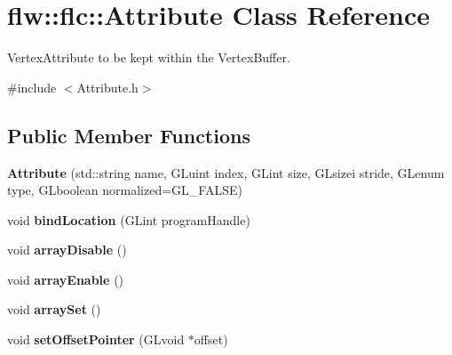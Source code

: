 \hypertarget{classflw_1_1flc_1_1Attribute}{}\section{flw\+:\+:flc\+:\+:Attribute Class Reference}
\label{classflw_1_1flc_1_1Attribute}


Vertex\+Attribute to be kept within the Vertex\+Buffer.  




{\ttfamily \#include $<$Attribute.\+h$>$}

\subsection*{Public Member Functions}
\begin{DoxyCompactItemize}
\item 
\mbox{\label{classflw_1_1flc_1_1Attribute_abbe4ffba91aaefc787ac017d592e6773}} 
{\bfseries Attribute} (std\+::string name, G\+Luint index, G\+Lint size, G\+Lsizei stride, G\+Lenum type, G\+Lboolean normalized=G\+L\+\_\+\+F\+A\+L\+SE)
\item 
\mbox{\label{classflw_1_1flc_1_1Attribute_a41919e71608837ae29fda0b7d4ed7855}} 
void {\bfseries bind\+Location} (G\+Lint program\+Handle)
\item 
\mbox{\label{classflw_1_1flc_1_1Attribute_a396301fa91b8fd19bd164fd9470c2e49}} 
void {\bfseries array\+Disable} ()
\item 
\mbox{\label{classflw_1_1flc_1_1Attribute_a9310a69f020ef1ad2f4b5e7be4ad58c4}} 
void {\bfseries array\+Enable} ()
\item 
\mbox{\label{classflw_1_1flc_1_1Attribute_a290fa65aa89c96dfa8f4b9ee29342857}} 
void {\bfseries array\+Set} ()
\item 
\mbox{\label{classflw_1_1flc_1_1Attribute_aec34115f61968c272e1724294988341b}} 
void {\bfseries set\+Offset\+Pointer} (G\+Lvoid $\ast$offset)
\item 
\mbox{\label{classflw_1_1flc_1_1Attribute_ab93f96f0ac409db8218733548f826631}} 

\end{DoxyCompactItemize}
